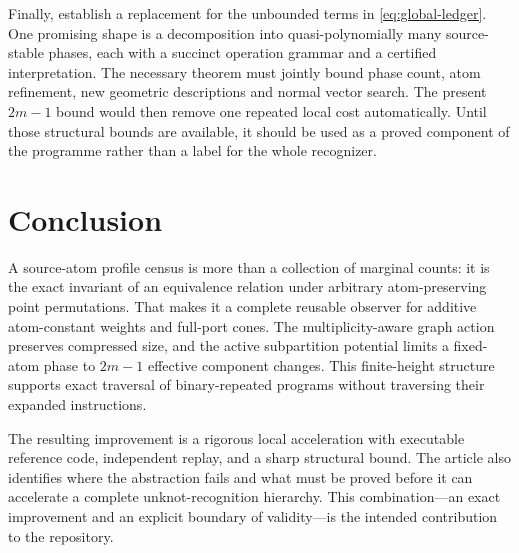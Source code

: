 Finally, establish a replacement for the unbounded terms in
\eqref{eq:global-ledger}. One promising shape is a decomposition into
quasi-polynomially many source-stable phases, each with a succinct operation
grammar and a certified interpretation. The necessary theorem must jointly
bound phase count, atom refinement, new geometric descriptions and normal
vector search. The present $2m-1$ bound would then remove one repeated local
cost automatically. Until those structural bounds are available, it should
be used as a proved component of the programme rather than a label for the
whole recognizer.

\section{Conclusion}

A source-atom profile census is more than a collection of marginal counts:
it is the exact invariant of an equivalence relation under arbitrary
atom-preserving point permutations. That makes it a complete reusable
observer for additive atom-constant weights and full-port cones. The
multiplicity-aware graph action preserves compressed size, and the active
subpartition potential limits a fixed-atom phase to $2m-1$ effective
component changes. This finite-height structure supports exact traversal of
binary-repeated programs without traversing their expanded instructions.

The resulting improvement is a rigorous local acceleration with executable
reference code, independent replay, and a sharp structural bound. The
article also identifies where the abstraction fails and what must be proved
before it can accelerate a complete unknot-recognition hierarchy. This
combination---an exact improvement and an explicit boundary of validity---is
the intended contribution to the repository.
